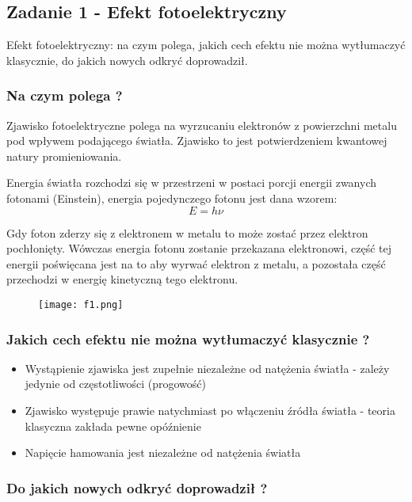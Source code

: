 \documentclass[a4paper,15pt]{article}
\newcommand{\issue}[2]{
    \begin{tcolorbox}[colback=issueColor!5!white,colframe=issueColor,title={Zagadnienie #1}]
        #2
    \end{tcolorbox}
}
\begin{document}
\subsection{Zadanie 1 - Efekt fotoelektryczny}

\issue{}{
Efekt  fotoelektryczny:  na  czym  polega,  jakich  cech  efektu  nie  można  wytłumaczyć  klasycznie, do jakich nowych odkryć doprowadził.
}

\subsubsection{Na czym polega ?}

Zjawisko fotoelektryczne polega na wyrzucaniu elektronów z powierzchni metalu pod wpływem podającego światła. Zjawisko to jest potwierdzeniem kwantowej natury promieniowania. 


Energia światła rozchodzi się w przestrzeni w postaci porcji energii zwanych fotonami (Einstein), energia pojedynczego fotonu jest dana wzorem:
\begin{equation*}
E = h\nu  
\end{equation*}

Gdy foton zderzy się z elektronem w metalu to może zostać przez elektron pochłonięty. Wówczas energia fotonu zostanie przekazana elektronowi, część tej energii poświęcana jest na to aby wyrwać elektron z metalu, a pozostała część przechodzi w energię kinetyczną tego elektronu. 

\begin{figure}[H]
\centerline{\texttt{[image: f1.png]}}
\end{figure}

\subsubsection{Jakich  cech  efektu  nie  można  wytłumaczyć  klasycznie ?}

\begin{itemize}
\item Wystąpienie zjawiska jest zupełnie niezależne od natężenia światła - zależy jedynie od częstotliwości (progowość)
\item Zjawisko występuje prawie natychmiast po włączeniu źródła światła - teoria klasyczna zakłada pewne opóźnienie
\item Napięcie hamowania jest niezależne od natężenia światła
\end{itemize}


\subsubsection{Do jakich nowych odkryć doprowadził ?}
\end{document}
